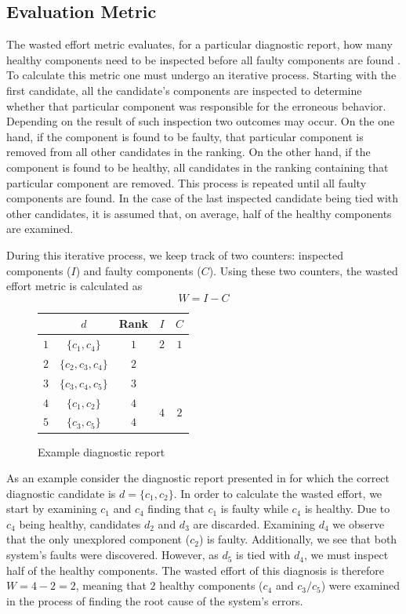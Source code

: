 \subsection{Evaluation Metric}
The wasted effort metric evaluates, for a particular diagnostic
report, how many healthy components need to be inspected before all
faulty components are found \citep{Steimann13}.
%
To calculate this metric one must undergo an iterative process.
%
Starting with the first candidate, all the candidate's components are
inspected to determine whether that particular component was
responsible for the erroneous behavior.
%
Depending on the result of such inspection two outcomes may occur.
%
On the one hand, if the component is found to be faulty, that particular
component is removed from all other candidates in the ranking.
%
On the other hand, if the component is found to be healthy, all
candidates in the ranking containing that particular component are
removed.
%
This process is repeated until all faulty components are found.
%
In the case of the last inspected candidate being tied with other
candidates, it is assumed that, on average, half of the healthy
components are examined.

During this iterative process, we keep track of two counters:
inspected components ($I$) and faulty components ($C$).
%
Using these two counters, the wasted effort metric is calculated as
\begin{equation}
  W = I - C
\end{equation}

\begin{figure}[ht]
  \begin{tabular}[m]{c|c|c||c|c}
    & $d$   &  Rank & $I$ & $C$\\\hline
    $1$ & $\{c_1,c_4\}$            & $1$ & $2$ & $1$\\
    $2$ & \sout{$\{c_2,c_3,c_4\}$} & $2$ &  & \\
    $3$ & \sout{$\{c_3,c_4,c_5\}$} & $3$ &  & \\
    $4$ & $\{$\sout{$c_1$}$,c_2\}$ & $4$ &\multirow{2}{*}{$4$} & \multirow{2}{*}{$2$}\\
    $5$ & $\{c_3,c_5\}$            & $4$ &   & \\
  \end{tabular}
  \caption{Example diagnostic report\label{fig:fuzzinel:candidate-ranking}}
\end{figure}

As an example consider the diagnostic report presented in
 for which the correct
diagnostic candidate is $d = \{c_1,c_2\}$.
%
In order to calculate the wasted effort, we start by examining $c_1$
and $c_4$ finding that $c_1$ is faulty while $c_4$ is healthy.
%
Due to $c_4$ being healthy, candidates $d_2$ and $d_3$ are discarded.
%
Examining $d_4$ we observe that the only unexplored component ($c_2$) is faulty.
%
Additionally, we see that both system's faults were discovered.
%
However, as $d_5$ is tied with $d_4$, we must inspect half of the
healthy components.
%
The wasted effort of this diagnosis is therefore $W = 4 - 2 = 2$,
meaning that $2$ healthy components ($c_4$ and $c_3/c_5$) were
examined in the process of finding the root cause of the system's
errors.

